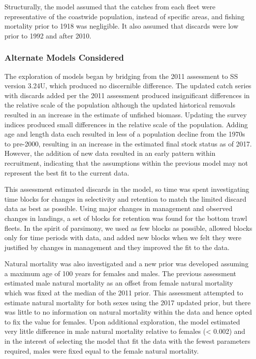 \documentclass[12pt,]{article}
\begin{document}
Structurally, the model assumed that the catches from each fleet were
representative of the coastwide population, instead of specific areas,
and fishing mortality prior to 1918 was negligible. It also assumed that
discards were low prior to 1992 and after 2010.

\subsubsection{Alternate Models
Considered}\label{alternate-models-considered}

The exploration of models began by bridging from the 2011 assessment to
SS version 3.24U, which produced no discernible difference. The updated
catch series with discards added per the 2011 assessment produced
insignificant differences in the relative scale of the population
although the updated historical removals resulted in an increase in the
estimate of unfished biomass. Updating the survey indices produced small
differences in the relative scale of the population. Adding age and
length data each resulted in less of a population decline from the 1970s
to pre-2000, resulting in an increase in the estimated final stock
status as of 2017. However, the addition of new data resulted in an
early pattern within recruitment, indicating that the assumptions within
the previous model may not represent the best fit to the current data.

This assessment estimated discards in the model, so time was spent
investigating time blocks for changes in selectivity and retention to
match the limited discard data as best as possible. Using major changes
in management and observed changes in landings, a set of blocks for
retention was found for the bottom trawl fleets. In the spirit of
parsimony, we used as few blocks as possible, allowed blocks only for
time periods with data, and added new blocks when we felt they were
justified by changes in management and they improved the fit to the
data.

Natural mortality was also investigated and a new prior was developed
assuming a maximum age of 100 years for females and males. The previous
assessment estimated male natural mortality as an offset from female
natural mortality which was fixed at the median of the 2011 prior. This
assessment attempted to estimate natural mortality for both sexes using
the 2017 updated prior, but there was little to no information on
natural mortality within the data and hence opted to fix the value for
females. Upon additional exploration, the model estimated very little
difference in male natural mortality relative to females (\textless{}
0.002) and in the interest of selecting the model that fit the data with
the fewest parameters required, males were fixed equal to the female
natural mortality.
\end{document}

